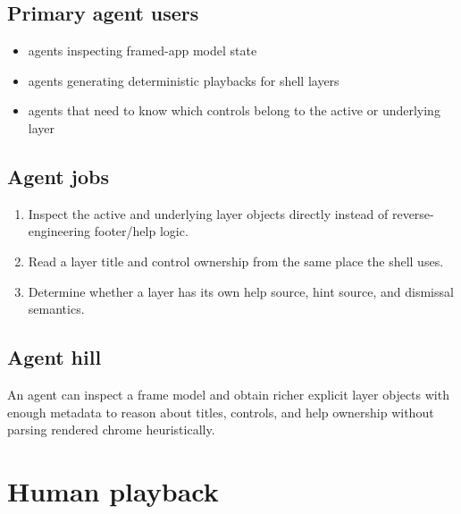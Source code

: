 \subsection{Primary agent users}\label{record-256-primary-agent-users}

\begin{itemize}
\tightlist
\item
  agents inspecting framed-app model state
\item
  agents generating deterministic playbacks for shell layers
\item
  agents that need to know which controls belong to the active or underlying layer
\end{itemize}

\subsection{Agent jobs}\label{record-256-agent-jobs}

\begin{enumerate}
\def\labelenumi{\arabic{enumi}.}
\tightlist
\item
  Inspect the active and underlying layer objects directly instead of reverse-engineering footer/help logic.
\item
  Read a layer title and control ownership from the same place the shell uses.
\item
  Determine whether a layer has its own help source, hint source, and dismissal semantics.
\end{enumerate}

\subsection{Agent hill}\label{record-256-agent-hill}

An agent can inspect a frame model and obtain richer explicit layer objects with enough metadata to reason about titles, controls, and help ownership without parsing rendered chrome heuristically.

\section{Human playback}\label{record-256-human-playback}

